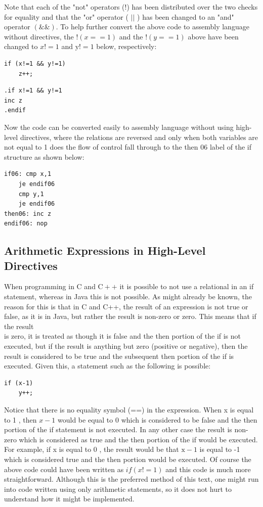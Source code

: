 \documentclass[10pt]{article}
\begin{document}
Note that each of the "not" operators (!) has been distributed over the two checks for equality and that the "or" operator ( $|\mid$ ) has been changed to an "and" operator $(\& \&)$. To help further convert the above code to assembly language without directives, the $!(x==1)$ and the $!(y==1)$ above have been changed to $x!=1$ and $\mathrm{y}!=1$ below, respectively:

\begin{verbatim}
if (x!=1 && y!=1)
    z++;
\end{verbatim}

\begin{verbatim}
.if x!=1 && y!=1
inc z
.endif
\end{verbatim}

Now the code can be converted easily to assembly language without using high-level directives, where the relations are reversed and only when both variables are not equal to 1 does the flow of control fall through to the then 06 label of the if structure as shown below:

\begin{verbatim}
if06: cmp x,1
    je endif06
    cmp y,1
    je endif06
then06: inc z
endif06: nop
\end{verbatim}

\subsection*{Arithmetic Expressions in High-Level Directives}
When programming in C and $\mathrm{C}++$ it is possible to not use a relational in an if statement, whereas in Java this is not possible. As might already be known, the reason for this is that in C and C++, the result of an expression is not true or false, as it is in Java, but rather the result is non-zero or zero. This means that if the result\\
is zero, it is treated as though it is false and the then portion of the if is not executed, but if the result is anything but zero (positive or negative), then the result is considered to be true and the subsequent then portion of the if is executed. Given this, a statement such as the following is possible:

\begin{verbatim}
if (x-1)
    y++;
\end{verbatim}

Notice that there is no equality symbol (==) in the expression. When x is equal to 1 , then $x-1$ would be equal to 0 which is considered to be false and the then portion of the if statement is not executed. In any other case the result is non-zero which is considered as true and the then portion of the if would be executed. For example, if x is equal to 0 , the result would be that $\mathrm{x}-1$ is equal to -1 which is considered true and the then portion would be executed. Of course the above code could have been written as $i f(x!=1)$ and this code is much more straightforward. Although this is the preferred method of this text, one might run into code written using only arithmetic statements, so it does not hurt to understand how it might be implemented.
\end{document}
